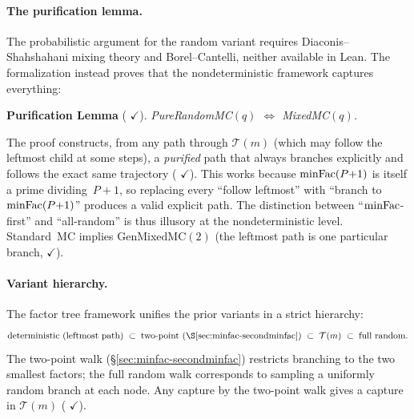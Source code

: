 \paragraph{The purification lemma.}
The probabilistic argument for the random variant requires
Diaconis--Shahshahani mixing theory and Borel--Cantelli, neither
available in Lean.  The formalization instead proves that the
nondeterministic framework captures everything:

\smallskip\noindent
\textbf{Purification Lemma}
(
{\color{leanink}$\checkmark$}).
\emph{PureRandomMC$(q)$ $\Leftrightarrow$ MixedMC$(q)$.}

\smallskip\noindent
The proof constructs, from any path through $\mathcal{T}(m)$ (which
may follow the leftmost child at some steps), a
\emph{purified} path that always branches explicitly and follows the
exact same trajectory
(
{\color{leanink}$\checkmark$}).
This works because $\mathrm{minFac}(P{+}1)$ is itself a prime dividing~$P{+}1$,
so replacing every ``follow leftmost'' with ``branch to
$\mathrm{minFac}(P{+}1)$'' produces a valid explicit path.
The distinction between ``$\mathrm{minFac}$-first'' and
``all-random'' is thus illusory at the nondeterministic level.
Standard~MC implies GenMixedMC$(2)$ (the leftmost path is one
particular branch,
{\color{leanink}$\checkmark$}).

\paragraph{Variant hierarchy.}
The factor tree framework unifies the prior variants in a strict
hierarchy:
\[
  \text{deterministic } (\text{leftmost path})
  \;\subset\;
  \text{two-point } (\S\ref{sec:minfac-secondminfac})
  \;\subset\;
  \mathcal{T}(m)
  \;\subset\;
  \text{full random.}
\]
The two-point walk (\S\ref{sec:minfac-secondminfac}) restricts
branching to the two smallest factors; the full random walk
corresponds to sampling a uniformly random branch at each node.
Any capture by the two-point walk gives a capture in $\mathcal{T}(m)$
(
{\color{leanink}$\checkmark$}).

